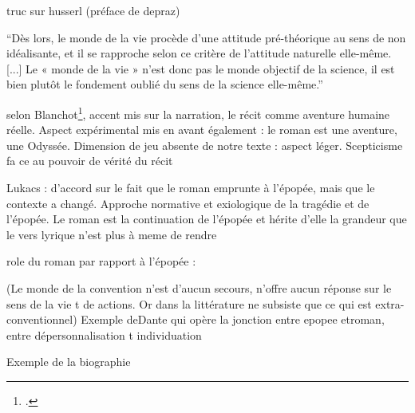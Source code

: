 \documentclass[a4paper,10pt]{article}
\begin{document}
truc sur husserl (préface de depraz)
\begin{center}
	\footnotesize
	\begin{minipage}{0.7\textwidth}
		``Dès lors, le monde de la vie procède d’une attitude pré-théorique au sens de non idéalisante, et il se rapproche selon ce critère de l’attitude naturelle elle-même. [...] Le « monde de la vie » n’est donc pas le monde objectif de la science, il est bien plutôt le fondement oublié du sens de
		la science elle-même.''
	\end{minipage}
\end{center}

selon Blanchot\footcite{Blanchot1959}, accent mis sur la narration, le récit comme aventure humaine réelle. Aspect expérimental mis en avant également : le roman est une aventure, une Odyssée. Dimension de jeu absente de notre texte : aspect léger. Scepticisme fa ce au pouvoir de vérité du récit




Lukacs : d'accord sur le fait que le roman emprunte à l'épopée, mais que le contexte a changé.
Approche normative et exiologique de la tragédie et de l'épopée. Le roman est la continuation de l'épopée et hérite d'elle la grandeur que le vers lyrique n'est plus à meme de rendre

role du roman par rapport à l'épopée :

(Le monde de la convention n'est d'aucun secours, n'offre aucun réponse sur le sens de la vie t de actions. Or dans la littérature ne subsiste que ce qui est extra-conventionnel)
Exemple deDante qui opère la jonction entre epopee etroman, entre dépersonnalisation t individuation

Exemple de la biographie
\medskip
\newpage


\end{document}
